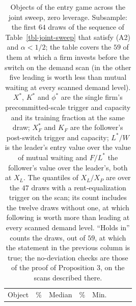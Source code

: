 \documentclass[
  11pt,
  letterpaper,
]{scrartcl}
\begin{document}
\begin{longtable}[]{@{}
  >{\raggedright\arraybackslash}p{}
  >{\raggedleft\arraybackslash}p{}
  >{\raggedleft\arraybackslash}p{}
  >{\raggedleft\arraybackslash}p{}
  >{\raggedleft\arraybackslash}p{}
  >{\raggedleft\arraybackslash}p{}
  >{\raggedright\arraybackslash}p{}
  >{\raggedleft\arraybackslash}p{}@{}}
\caption{Objects of the entry game across the joint sweep, zero
leverage. Subsample: the first \(64\) draws of the sequence of
Table~\ref{tbl-joint-sweep} that satisfy (A2) and \(\alpha < 1/2\); the
table covers the \(59\) of them at which a firm invests before the
switch on the demand scan (in the other five leading is worth less than
mutual waiting at every scanned demand level). \(X^*\), \(K^*\) and
\(\phi^*\) are the single firm's precommitted-scale trigger and capacity
and its training fraction at the same draw; \(X_F^*\) and \(K_F\) are
the follower's post-switch trigger and capacity; \(L^*/W\) is the
leader's entry value over the value of mutual waiting and \(F/L^*\) the
follower's value over the leader's, both at \(X_L\). The quantiles of
\(X_L/X_P\) are over the \(47\) draws with a rent-equalization trigger
on the scan; its count includes the twelve draws without one, at which
following is worth more than leading at every scanned demand level.
``Holds in'' counts the draws, out of \(59\), at which the statement in
the previous column is true; the no-deviation checks are those of the
proof of Proposition 3, on the scans described
there.}\label{tbl-duopoly-sweep}\tabularnewline
\toprule\noalign{}
\begin{minipage}[b]{\linewidth}\raggedright
Object
\end{minipage} & \begin{minipage}[b]{\linewidth}\raggedleft
5\%
\end{minipage} & \begin{minipage}[b]{\linewidth}\raggedleft
Median
\end{minipage} & \begin{minipage}[b]{\linewidth}\raggedleft
95\%
\end{minipage} & \begin{minipage}[b]{\linewidth}\raggedleft
Min.
\end{minipage} & \begin{minipage}[b]{\linewidth}\raggedleft

\end{minipage}
\end{longtable}
\end{document}

